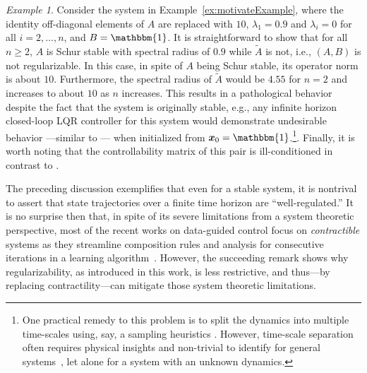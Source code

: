 \documentclass[journal]{IEEEtran}
\theoremstyle{definition}
\theoremstyle{remark}
\newtheorem{example}{Example}
\newcommand\x{{\bm x}}
\begin{document}
	\begin{example}
    	Consider the system in Example~\ref{ex:motivateExample}, where the identity off-diagonal elements of $A$ are replaced with $10$, $\lambda_1 = 0.9$ and $\lambda_i = 0$ for all $i=2,\dots, n$, and $B = \mathbbm{1}$.
    	It is straightforward to show that for all $n\geq 2$, $A$ is Schur stable with spectral radius of $0.9$ while $\widetilde{A}$ is not, i.e., $(A,B)$ is not regularizable.
    	In this case, in spite of $A$ being Schur stable, its operator norm is about $10$.
    	Furthermore, the spectral radius of $\widetilde{A}$ would be $4.55$ for $n=2$ and increases to about $10$ as $n$ increases.
    	This results in a pathological behavior despite the fact that the system is originally stable, e.g.,
    	any infinite horizon closed-loop \ac{LQR} controller for this system would demonstrate undesirable behavior ---similar to --- when initialized from $\x_0 = \mathbbm{1}$.\footnote{One practical remedy to this problem is to split the dynamics into multiple time-scales using, say, a sampling heuristics \cite{manohar2019optimized}.
    	However, time-scale separation often requires physical insights and non-trivial to identify for  general systems~\cite{naidu2001singular}, let alone for a system with an unknown dynamics.}.
    	Finally, it is worth noting that the controllability matrix of this pair is ill-conditioned in contrast to .
	\end{example}
	
	The preceding discussion exemplifies that even for a stable system, it is nontrival to assert that state trajectories over a finite time horizon are ``well-regulated.''
	It is no surprise then that, in spite of its severe limitations from a system theoretic perspective, most of the recent works on data-guided control focus on {\em contractible} systems as they streamline composition rules and analysis for consecutive iterations in a learning algorithm~\cite{lale2020regret, agarwal2019online}. However, the succeeding remark shows why regularizability, as introduced in this work, is less restrictive, and thus---by replacing contractility---can mitigate those system theoretic limitations. 
	
\end{document}
